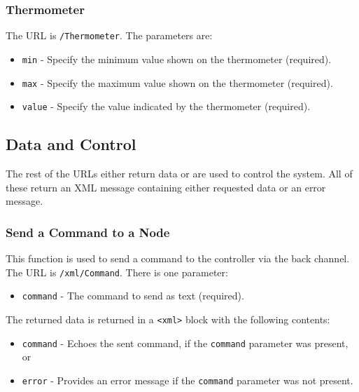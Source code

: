 \documentclass[10pt, openany, draft]{article}
\begin{document}
\subsubsection{Thermometer}
The URL is \texttt{/Thermometer}.  The parameters are:
\begin{itemize}
  \item \texttt{min} - Specify the minimum value shown on the thermometer (required).
  \item \texttt{max} - Specify the maximum value shown on the thermometer (required).
  \item \texttt{value} - Specify the value indicated by the thermometer (required).
\end{itemize}

\subsection{Data and Control}
The rest of the URLs either return data or are used to control the system.  All of these return an XML message containing either requested data or an error message.

\subsubsection{Send a Command to a Node}
This function is used to send a command to the controller via the back channel.  The URL is \texttt{/xml/Command}.  There is one parameter:
\begin{itemize}
  \item \texttt{command} - The command to send as text (required).
\end{itemize}

The returned data is returned in a \texttt{<xml>} block with the following contents:
\begin{itemize}
  \item \texttt{command} - Echoes the sent command, if the \texttt{command} parameter was present, or
  \item \texttt{error} - Provides an error message if the \texttt{command} parameter was not present.
\end{itemize}

\end{document}
